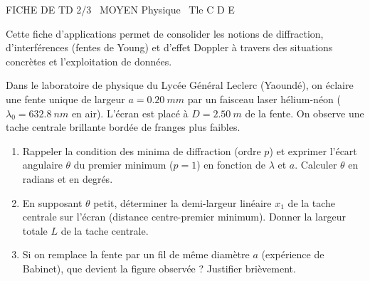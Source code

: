 \documentclass[11pt]{article}
\begin{document}
\begin{tcolorbox}[enhanced,colback=popink,colframe=popink,arc=10pt,boxrule=0pt,left=12pt,right=12pt,top=9pt,bottom=9pt]
{\color{white}\popxbold\small FICHE DE TD 2/3 \textbullet\ MOYEN \hfill Physique \textbullet\ Tle C D E\par}
\end{tcolorbox}
\vspace{4pt}
Cette fiche d'applications permet de consolider les notions de diffraction, d'interférences (fentes de Young) et d'effet Doppler à travers des situations concrètes et l'exploitation de données.

\begin{exercice}
Dans le laboratoire de physique du Lycée Général Leclerc (Yaoundé), on éclaire une fente unique de largeur $a = \SI{0,20}{mm}$ par un faisceau laser hélium-néon ($\lambda_0 = \SI{632,8}{nm}$ en air). L'écran est placé à $D = \SI{2,50}{m}$ de la fente. On observe une tache centrale brillante bordée de franges plus faibles.
\begin{enumerate}
    \item Rappeler la condition des minima de diffraction (ordre $p$) et exprimer l'écart angulaire $\theta$ du premier minimum ($p=1$) en fonction de $\lambda$ et $a$. Calculer $\theta$ en radians et en degrés.
    \item En supposant $\theta$ petit, déterminer la demi-largeur linéaire $x_1$ de la tache centrale sur l'écran (distance centre-premier minimum). Donner la largeur totale $L$ de la tache centrale.
    \item Si on remplace la fente par un fil de même diamètre $a$ (expérience de Babinet), que devient la figure observée ? Justifier brièvement.
\end{enumerate}
\end{exercice}
\end{document}
